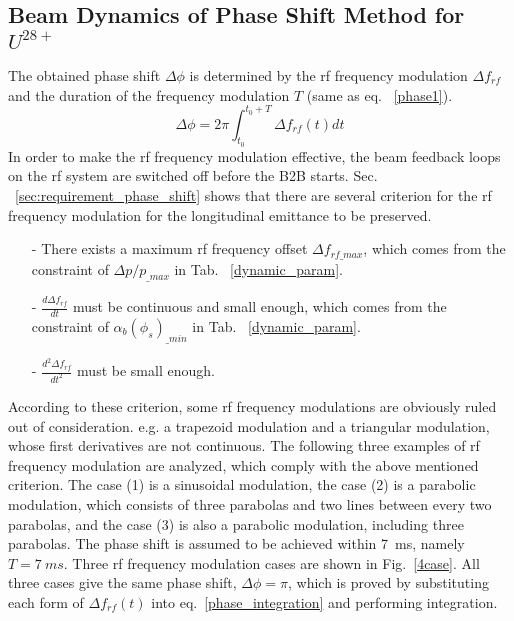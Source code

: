 \subsection{Beam Dynamics of Phase Shift Method for $U^\mathit{28+}$}
The obtained phase shift $\Delta \phi$ is determined by the rf frequency modulation $\Delta f_{rf}$ and the duration of the frequency modulation $T$ (same as eq. ~\ref{phase1}). 
\begin{equation}
\Delta \phi= 2\pi \int_{t_0}^{t_0+T} \Delta f_{rf}(t)dt \label{phase_integration}
\end{equation}
In order to make the rf frequency modulation effective, the beam feedback loops on the rf system are switched off before the B2B starts. Sec. ~\ref{sec:requirement_phase_shift} shows that there are several criterion for the rf frequency modulation for the longitudinal emittance to be preserved.
\begin{itemize}
\item[-]
There exists a maximum rf frequency offset $\Delta f_\mathit{rf\_max}$, which comes from the constraint of $\Delta p/p_\mathit{\_max}$ in Tab. ~\ref{dynamic_param}.
\item[-]
$\frac{d\Delta f_{\mathit{rf}}}{dt}$ must be continuous and small enough, which comes from the constraint of $\alpha_b(\phi_{s})_\mathit{\_min}$ in Tab. ~\ref{dynamic_param}.
\item[-]
$\frac{d^2\Delta f_{\mathit{rf}}}{dt^2}$ must be small enough. 
\end{itemize}

According to these criterion, some rf frequency modulations are obviously ruled out of consideration. e.g. a trapezoid modulation and a triangular modulation, whose first derivatives are not continuous. The following three examples of rf frequency modulation are analyzed, which comply with the above mentioned criterion. The case (1) is a sinusoidal modulation, the case (2) is a parabolic modulation, which consists of three parabolas and two lines between every two parabolas, and the case (3) is also a parabolic modulation, including three parabolas. The phase shift is assumed to be achieved within \SI{7}{ms}, namely $T=\SI{7}{ms}$. Three rf frequency modulation cases are shown in Fig.~\ref{4case}. All three cases give the same phase shift, $\Delta \phi=\pi$, which is proved by substituting each form of $\Delta f_{rf}(t)$ into eq.~\ref{phase_integration} and performing integration. 

